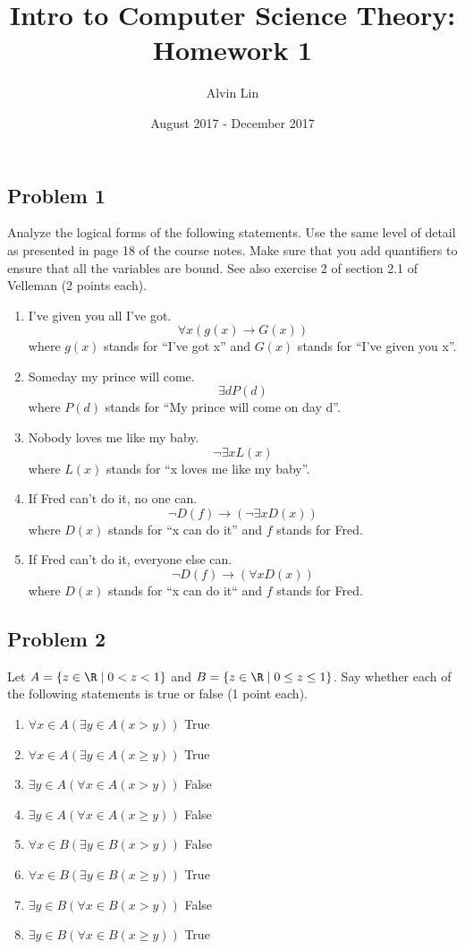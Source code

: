 \documentclass[letterpaper, 12pt]{math}
\title{Intro to Computer Science Theory: Homework 1}
\author{Alvin Lin}
\date{August 2017 - December 2017}
\begin{document}
\maketitle

\subsection*{Problem 1}
Analyze the logical forms of the following statements. Use the same level of
detail as presented in page 18 of the course notes. Make sure that you add
quantifiers to ensure that all the variables are bound. See also exercise 2 of
section 2.1 of Velleman (2 points each).
\begin{enumerate}
  \item I've given you all I've got.
    \[ \forall{x}(g(x)\to G(x)) \]
    where \( g(x) \) stands for ``I've got x'' and \( G(x) \) stands for ``I've
    given you x''.
  \item Someday my prince will come.
    \[ \exists{d}P(d) \]
    where \( P(d) \) stands for ``My prince will come on day d''.
  \item Nobody loves me like my baby.
    \[ \neg\exists{x}L(x) \]
    where \( L(x) \) stands for ``x loves me like my baby''.
  \item If Fred can't do it, no one can.
    \[ \neg D(f)\to(\neg\exists{x}D(x)) \]
    where \( D(x) \) stands for ``x can do it'' and \( f \) stands for Fred.
  \item If Fred can't do it, everyone else can.
    \[ \neg D(f)\to(\forall{x}D(x)) \]
    where \( D(x) \) stands for ``x can do it`` and \( f \) stands for Fred.
\end{enumerate}

\subsection*{Problem 2}
Let \( A = \{z\in\R \mid 0 < z < 1\} \) and \( B = \{z\in\R \mid 0 \le z \le
1\} \). Say whether each of the following statements is true or false (1 point
each).
\begin{enumerate}
  \item \( \forall{x}\in A(\exists{y}\in A(x > y)) \) True
  \item \( \forall{x}\in A(\exists{y}\in A(x \ge y)) \) True
  \item \( \exists{y}\in A(\forall{x}\in A(x > y)) \) False
  \item \( \exists{y}\in A(\forall{x}\in A(x \ge y)) \) False
  \item \( \forall{x}\in B(\exists{y}\in B(x > y)) \) False
  \item \( \forall{x}\in B(\exists{y}\in B(x \ge y)) \) True
  \item \( \exists{y}\in B(\forall{x}\in B(x > y)) \) False
  \item \( \exists{y}\in B(\forall{x}\in B(x \ge y)) \) True
\end{enumerate}
\end{document}
